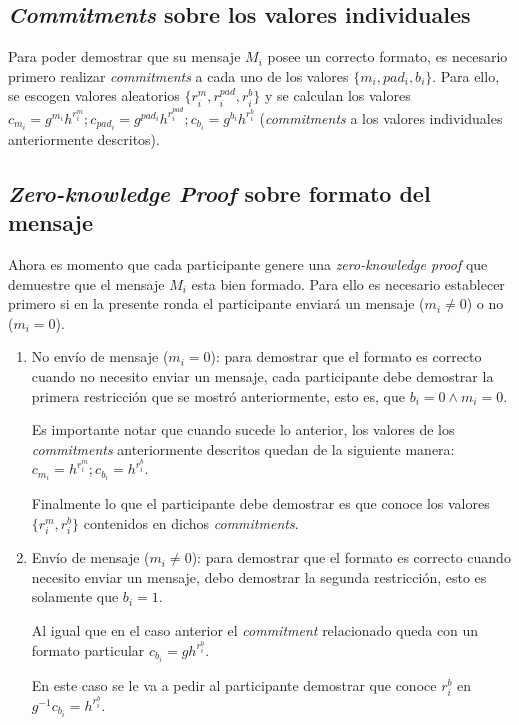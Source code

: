 \subsection{\emph{Commitments} sobre los valores individuales}

Para poder demostrar que su mensaje $M_i$ posee un correcto formato, es necesario 
primero realizar \emph{commitments} a cada uno de los valores $\{m_i, pad_i, b_i\}$. 
Para ello, se escogen valores aleatorios $\{r_i^m, r_i^{pad}, r_i^b\}$ y se calculan 
los valores $c_{m_i} = g^{m_i} h^{r_i^m}; c_{pad_i} = g^{pad_i} h^{r_i^{pad}}; c_{b_i} = g^{b_i} h^{r_i^b}$ 
(\emph{commitments} a los valores individuales anteriormente descritos).

\subsection{\emph{Zero-knowledge Proof} sobre formato del mensaje}

Ahora es momento que cada participante genere una \emph{zero-knowledge proof} que 
demuestre que el mensaje $M_i$ esta bien formado. Para ello es necesario establecer 
primero si en la presente ronda el participante enviará un mensaje ($m_i \neq 0$) o 
no ($m_i = 0$).

\begin{enumerate}
    \item No envío de mensaje ($m_i = 0$): para demostrar que el formato es correcto 
    cuando no necesito enviar un mensaje, cada participante debe demostrar la primera 
    restricción que se mostró anteriormente, esto es, que $b_i = 0 \land m_i = 0$.
    
    Es importante notar que cuando sucede lo anterior, los valores de los 
    \emph{commitments} anteriormente descritos quedan de la siguiente manera: 
    $c_{m_i} = h^{r_i^m}; c_{b_i} = h^{r_i^b}$.
    
    Finalmente lo que el participante debe demostrar es que conoce los valores 
    $\{r_i^m, r_i^b\}$ contenidos en dichos \emph{commitments}.
    \item Envío de mensaje ($m_i \neq 0$): para demostrar que el formato es 
    correcto cuando necesito enviar un mensaje, debo demostrar la segunda 
    restricción, esto es solamente que $b_i = 1$.
    
    Al igual que en el caso anterior el \emph{commitment} relacionado queda con 
    un formato particular $c_{b_i} = g h^{r_i^b}$.
    
    En este caso se le va a pedir al participante demostrar que conoce $r_i^b$ 
    en $g^{-1} c_{b_i} = h^{r_i^b}$.
\end{enumerate}

